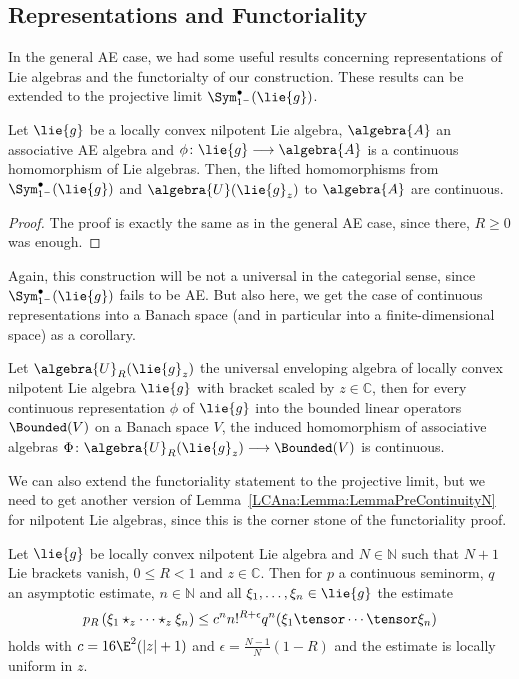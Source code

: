 \subsection{Representations and Functoriality}
\label{subsec:NilpotentFunctorialityRepresentations}

In the general AE case, we had some useful results concerning representations 
of Lie algebras and the functorialty of our construction. These results can be 
extended to the projective limit $\Sym_{1^-}^{\bullet}(\lie{g})$.
\begin{proposition}
	\label{Nilpot:Prop:UnivProperty}
	Let $\lie{g}$ be a locally convex nilpotent Lie algebra, $\algebra{A}$ an 
	associative AE algebra and $\phi \colon \lie{g} \longrightarrow 
	\algebra{A}$ is a continuous homomorphism of Lie algebras. Then, the 
	lifted homomorphisms from $\Sym_{1^-}^{\bullet}(\lie{g})$ and 
	$\algebra{U}(\lie{g}_z)$ to $\algebra{A}$ are continuous.
\end{proposition}
\begin{proof}
	The proof is exactly the same as in the general AE case, since there, 
	$R \geq 0$ was enough.
\end{proof}
Again, this construction will be not a universal in the categorial sense, 
since $\Sym_{1^-}^{\bullet}(\lie{g})$ fails to be AE. But also here, we get 
the case of continuous representations into a Banach space (and in particular 
into a finite-dimensional space) as a corollary.
\begin{corollary}
    \label{Nilpot:Coro:ContinuousRepresentations}%
    Let $\algebra{U}_R(\lie{g}_z)$ the universal enveloping algebra of locally 
    convex nilpotent Lie algebra $\lie{g}$ with bracket scaled by $z \in 
    \mathbb{C}$, then for every continuous 
    representation $\phi$ of $\lie{g}$ into the bounded linear operators 
    $\Bounded(V)$ on a Banach space $V$, the induced homomorphism of 
    associative algebras $\Phi \colon \algebra{U}_R(\lie{g}_z) \longrightarrow 
    \Bounded(V)$ is continuous.
\end{corollary}
We can also extend the functoriality statement to the projective limit, but we 
need to get another version of Lemma~\ref{LCAna:Lemma:LemmaPreContinuityN} for 
nilpotent Lie algebras, since this is the corner stone of the functoriality 
proof.
\begin{lemma}
    \label{Lemma:Nilpot:LemmaPreContinuityN}%
    Let $\lie{g}$ be locally convex nilpotent Lie algebra and $N \in 
    \mathbb{N}$ such that $N + 1$ Lie brackets vanish, $0 \leq R < 1$ and 
    $z \in \mathbb{C}$. Then for $p$ a continuous seminorm, $q$ an
    asymptotic estimate, $n \in \mathbb{N}$ and all $\xi_1, \ldots,
    \xi_n \in \lie{g}$ the estimate
    \begin{equation}
        \label{Nilpot:LemmaPreContinuityN}
        p_R \left(
            \xi_1 \star_z \cdots \star_z \xi_n
        \right)
        \leq
        c^n n!^{R + \epsilon}
        q^n(\xi_1 \tensor \cdots \tensor \xi_n)
    \end{equation}
    holds with $c = 16 \E^2 (|z| + 1)$ and $\epsilon = \frac{N-1}{N}(1 - R)$
    and the estimate is locally uniform in $z$.
\end{lemma}
